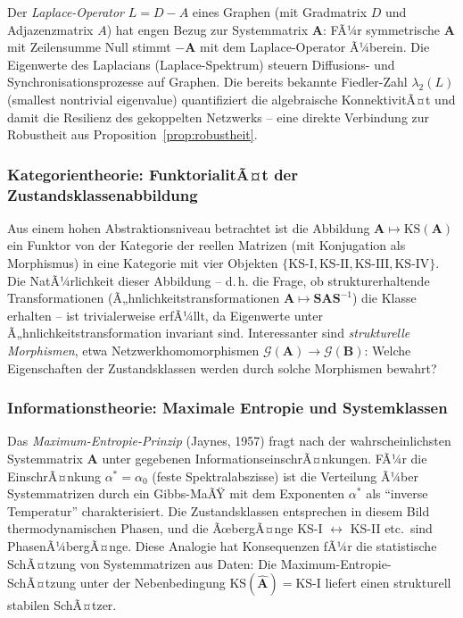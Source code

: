 ﻿\documentclass[12pt, a4paper, titlepage]{report}
\theoremstyle{definition}
\theoremstyle{remark}
\newcommand{\vA}{\bm{A}}
\newcommand{\vB}{\bm{B}}
\newcommand{\vS}{\bm{S}}
\newcommand{\KS}{\mathrm{KS}}
\begin{document}
Der \emph{Laplace-Operator} $L = D - A$ eines Graphen (mit Gradmatrix $D$ und
Adjazenzmatrix $A$) hat engen Bezug zur Systemmatrix $\vA$: FÃ¼r symmetrische $\vA$
mit Zeilensumme Null stimmt $-\vA$ mit dem Laplace-Operator Ã¼berein. Die Eigenwerte
des Laplacians (Laplace-Spektrum) steuern Diffusions- und Synchronisationsprozesse
auf Graphen. Die bereits bekannte Fiedler-Zahl $\lambda_2(L)$ (smallest nontrivial
eigenvalue) quantifiziert die algebraische KonnektivitÃ¤t und damit die
Resilienz des gekoppelten Netzwerks -- eine direkte Verbindung zur Robustheit
aus Proposition~\ref{prop:robustheit}.

\subsubsection*{Kategorientheorie: FunktorialitÃ¤t der Zustandsklassenabbildung}

Aus einem hohen Abstraktionsniveau betrachtet ist die Abbildung
$\vA \mapsto \KS(\vA)$ ein Funktor von der Kategorie der reellen Matrizen
(mit Konjugation als Morphismus) in eine Kategorie mit vier Objekten
$\{\KS\text{-I}, \KS\text{-II}, \KS\text{-III}, \KS\text{-IV}\}$.
Die NatÃ¼rlichkeit dieser Abbildung -- d.\,h. die Frage, ob strukturerhaltende
Transformationen (Ã„hnlichkeitstransformationen $\vA \mapsto \vS\vA\vS^{-1}$)
die Klasse erhalten -- ist trivialerweise erfÃ¼llt, da Eigenwerte unter
Ã„hnlichkeitstransformation invariant sind. Interessanter sind \emph{strukturelle
Morphismen}, etwa Netzwerkhomomorphismen $\mathcal{G}(\vA) \to \mathcal{G}(\vB)$:
Welche Eigenschaften der Zustandsklassen werden durch solche Morphismen bewahrt?

\subsubsection*{Informationstheorie: Maximale Entropie und Systemklassen}

Das \emph{Maximum-Entropie-Prinzip} (Jaynes, 1957) fragt nach der
wahrscheinlichsten Systemmatrix $\vA$ unter gegebenen InformationseinschrÃ¤nkungen.
FÃ¼r die EinschrÃ¤nkung $\alpha^* = \alpha_0$ (feste Spektralabszisse) ist die
Verteilung Ã¼ber Systemmatrizen durch ein Gibbs-MaÃŸ mit dem Exponenten $\alpha^*$
als ``inverse Temperatur'' charakterisiert. Die Zustandsklassen entsprechen in
diesem Bild thermodynamischen Phasen, und die ÃœbergÃ¤nge KS-I $\leftrightarrow$ KS-II
etc.\ sind PhasenÃ¼bergÃ¤nge. Diese Analogie hat Konsequenzen fÃ¼r die statistische
SchÃ¤tzung von Systemmatrizen aus Daten: Die Maximum-Entropie-SchÃ¤tzung unter der
Nebenbedingung $\KS(\hat{\vA}) = \KS\text{-I}$ liefert einen strukturell stabilen
SchÃ¤tzer.
\end{document}
